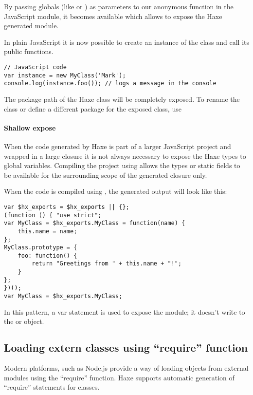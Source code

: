 By passing globals (like  or ) as parameters to our anonymous function in the JavaScript module, it becomes available which allows to expose the Haxe generated module.

In plain JavaScript it is now possible to create an instance of the class and call its public functions.

\begin{lstlisting}
// JavaScript code
var instance = new MyClass('Mark');
console.log(instance.foo()); // logs a message in the console
\end{lstlisting}

The package path of the Haxe class will be completely exposed. To rename the class or define a different package for the exposed class, use 

\paragraph{Shallow expose}

When the code generated by Haxe is part of a larger JavaScript project and wrapped in a large closure it is not always necessary to expose the Haxe types to global variables.
Compiling the project using  allows the types or static fields to be available for the surrounding scope of the generated closure only.

When the code is compiled using , the generated output will look like this:

\begin{lstlisting}
var $hx_exports = $hx_exports || {};
(function () { "use strict";
var MyClass = $hx_exports.MyClass = function(name) {
	this.name = name;
};
MyClass.prototype = {
	foo: function() {
		return "Greetings from " + this.name + "!";
	}
};
})();
var MyClass = $hx_exports.MyClass;
\end{lstlisting}

In this pattern, a var statement is used to expose the module; it doesn't write to the  or  object. 

\subsection{Loading extern classes using ``require'' function}
\label{target-javascript-require}

Modern  platforms, such as Node.js provide a way of loading objects
from external modules using the ``require'' function. Haxe supports automatic generation
of ``require'' statements for  classes.


